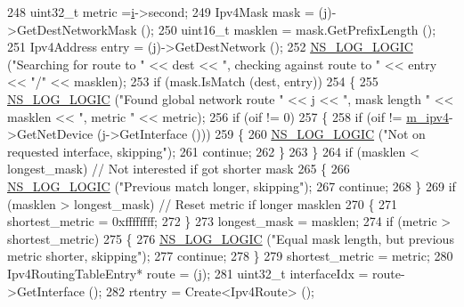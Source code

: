 \begin{DoxyCode}
248       uint32\_t metric =\hyperlink{bernuolliDistribution_8m_a6f6ccfcf58b31cb6412107d9d5281426}{i}->second;
249       Ipv4Mask mask = (j)->GetDestNetworkMask ();
250       uint16\_t masklen = mask.GetPrefixLength ();
251       Ipv4Address entry = (j)->GetDestNetwork ();
252       \hyperlink{group__logging_ga88acd260151caf2db9c0fc84997f45ce}{NS\_LOG\_LOGIC} (\textcolor{stringliteral}{"Searching for route to "} << dest << \textcolor{stringliteral}{", checking against route to "} << 
      entry << \textcolor{stringliteral}{"/"} << masklen);
253       \textcolor{keywordflow}{if} (mask.IsMatch (dest, entry)) 
254         \{
255           \hyperlink{group__logging_ga88acd260151caf2db9c0fc84997f45ce}{NS\_LOG\_LOGIC} (\textcolor{stringliteral}{"Found global network route "} << j << \textcolor{stringliteral}{", mask length "} << masklen << \textcolor{stringliteral}{",
       metric "} << metric);
256           \textcolor{keywordflow}{if} (oif != 0)
257             \{
258               \textcolor{keywordflow}{if} (oif != \hyperlink{classns3_1_1Ipv4StaticRouting_adc30356be1824ea40ffbd444a5d91b9f}{m\_ipv4}->GetNetDevice (j->GetInterface ()))
259                 \{
260                   \hyperlink{group__logging_ga88acd260151caf2db9c0fc84997f45ce}{NS\_LOG\_LOGIC} (\textcolor{stringliteral}{"Not on requested interface, skipping"});
261                   \textcolor{keywordflow}{continue};
262                 \}
263             \}
264           \textcolor{keywordflow}{if} (masklen < longest\_mask) \textcolor{comment}{// Not interested if got shorter mask}
265             \{
266               \hyperlink{group__logging_ga88acd260151caf2db9c0fc84997f45ce}{NS\_LOG\_LOGIC} (\textcolor{stringliteral}{"Previous match longer, skipping"});
267               \textcolor{keywordflow}{continue};
268             \}
269           \textcolor{keywordflow}{if} (masklen > longest\_mask) \textcolor{comment}{// Reset metric if longer masklen}
270             \{
271               shortest\_metric = 0xffffffff;
272             \}
273           longest\_mask = masklen;
274           \textcolor{keywordflow}{if} (metric > shortest\_metric)
275             \{
276               \hyperlink{group__logging_ga88acd260151caf2db9c0fc84997f45ce}{NS\_LOG\_LOGIC} (\textcolor{stringliteral}{"Equal mask length, but previous metric shorter, skipping"});
277               \textcolor{keywordflow}{continue};
278             \}
279           shortest\_metric = metric;
280           Ipv4RoutingTableEntry* route = (j);
281           uint32\_t interfaceIdx = route->GetInterface ();
282           rtentry = Create<Ipv4Route> ();

\end{DoxyCode}
